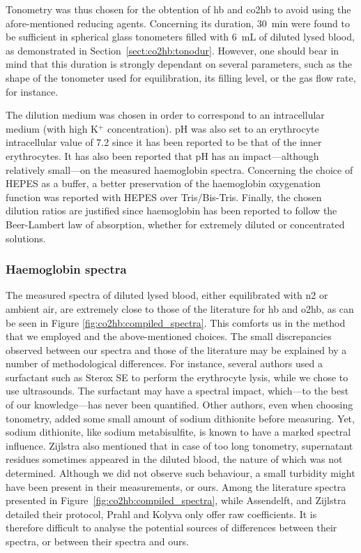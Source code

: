 Tonometry was thus chosen for the obtention of \gls{hb} and \gls{co2hb} to avoid using the afore-mentioned reducing agents. Concerning its duration, 30~min were found to be sufficient in spherical glass tonometers filled with 6~mL of diluted lysed blood, as demonstrated in Section~\ref{sect:co2hb:tonodur}. However, one should bear in mind that this duration is strongly dependant on several parameters, such as the shape of the tonometer used for equilibration, its filling level, or the gas flow rate, for instance.

The dilution medium was chosen in order to correspond to an intracellular medium (with high K$^+$ concentration). pH was also set to an erythrocyte intracellular value of 7.2 since it has been reported to be that of the inner erythrocytes\cite{jensen2004, kummerow2000}. It has also been reported that pH has an impact---although relatively small---on the measured haemoglobin spectra\cite{dalziel1957, wimberley1988, zijlstra1997}. Concerning the choice of HEPES as a buffer, a better preservation of the haemoglobin oxygenation function was reported with HEPES over Tris/Bis-Tris\cite{weber1992}. Finally, the chosen dilution ratios are justified since haemoglobin has been reported to follow the Beer-Lambert law of absorption, whether for extremely diluted or concentrated solutions\cite{drabkin1935}.

\subsubsection{Haemoglobin spectra}

The measured spectra of diluted lysed blood, either equilibrated with \gls{n2} or ambient air, are extremely close to those of the literature for \gls{hb} and \gls{o2hb}, as can be seen in Figure \ref{fig:co2hb:compiled_spectra}. This comforts us in the method that we employed and the above-mentioned choices. The small discrepancies observed between our spectra and those of the literature may be explained by a number of methodological differences. For instance, several authors\cite{assendelft1970, mook1979, zijlstra1991} used a surfactant such as Sterox SE to perform the erythrocyte lysis, while we chose to use ultrasounds. The surfactant may have a spectral impact, which---to the best of our knowledge---has never been quantified. Other authors, even when choosing tonometry, added some small amount of sodium dithionite before measuring\cite{zijlstra2000}. Yet, sodium dithionite, like sodium metabisulfite, is known to have a marked spectral influence\cite{dalziel1957}. Zijlstra \etal{}\cite{zijlstra2000} also mentioned that in case of too long tonometry, supernatant residues sometimes appeared in the diluted blood, the nature of which was not determined. Although we did not observe such behaviour, a small turbidity might have been present in their measurements, or ours. Among the literature spectra presented in Figure~\ref{fig:co2hb:compiled_spectra}, while Assendelft, and Zijlstra detailed their protocol, Prahl and Kolyva only offer raw coefficients. It is therefore difficult to analyse the potential sources of differences between their spectra, or between their spectra and ours.

